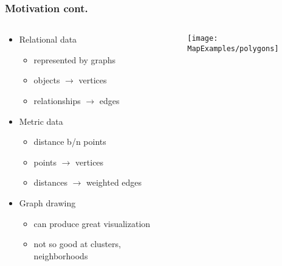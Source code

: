 \documentclass{beamer}
\begin{document}
\begin{frame}[plain]\frametitle{Motivation cont.}
\begin{columns}
\begin{column}{5cm}
\begin{itemize}
\item Relational data 
\begin{itemize}
\item represented by graphs
\item objects $\rightarrow$ vertices
\item relationships $\rightarrow$ edges
\end{itemize}

\item Metric data 
\begin{itemize}
\item distance b/n points
\item points $\rightarrow$ vertices
\item distances $\rightarrow$ weighted edges
\end{itemize}
\item Graph drawing
\begin{itemize}
\item can produce great visualization
\item not so good at clusters, neighborhoods
\end{itemize} 
\end{itemize}
\end{column}
\begin{column}{5cm}
\texttt{[image: MapExamples/polygons]}
\end{column}
\end{columns}
\end{frame}
\end{document}
